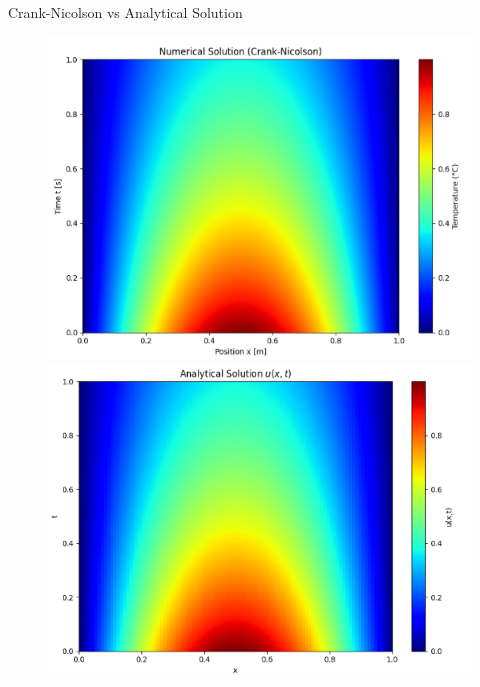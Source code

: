 \documentclass{beamer}
\begin{document}
\begin{frame}{Crank-Nicolson vs Analytical Solution}
    \begin{figure}[H]
        \centering
        \begin{minipage}{0.48\textwidth}
            \centering
            \includegraphics[width=\linewidth]{pres_CN.png}
        \end{minipage}
        \hfill
        \begin{minipage}{0.48\textwidth}
            \centering
            \includegraphics[width=\linewidth]{pres_analytical.png}
        \end{minipage}
    \end{figure}
\end{frame}
\end{document}
